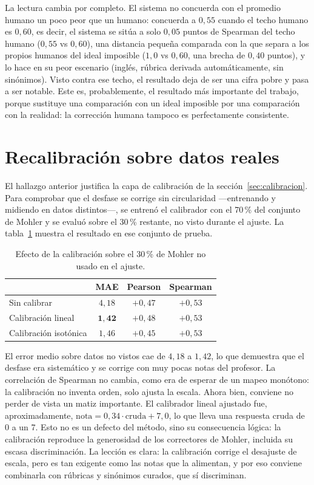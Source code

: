 La lectura cambia por completo. El sistema no concuerda con el promedio humano un poco peor que un humano: concuerda a $0{,}55$ cuando el techo humano es $0{,}60$, es decir, el sistema se sitúa a solo $0{,}05$ puntos de Spearman del techo humano ($0{,}55$ vs $0{,}60$), una distancia pequeña comparada con la que separa a los propios humanos del ideal imposible ($1{,}0$ vs $0{,}60$, una brecha de $0{,}40$ puntos), y lo hace en su peor escenario (inglés, rúbrica derivada automáticamente, sin sinónimos). Visto contra ese techo, el resultado deja de ser una cifra pobre y pasa a ser notable. Este es, probablemente, el resultado más importante del trabajo, porque sustituye una comparación con un ideal imposible por una comparación con la realidad: la corrección humana tampoco es perfectamente consistente.

\section{Recalibración sobre datos reales}

El hallazgo anterior justifica la capa de calibración de la sección~\ref{sec:calibracion}. Para comprobar que el desfase se corrige sin circularidad —entrenando y midiendo en datos distintos—, se entrenó el calibrador con el 70\,\% del conjunto de Mohler y se evaluó sobre el 30\,\% restante, no visto durante el ajuste. La tabla~\ref{tab:calibracion} muestra el resultado en ese conjunto de prueba.

\begin{table}[ht]
\centering
\caption{Efecto de la calibración sobre el 30\,\% de Mohler no usado en el ajuste.}
\label{tab:calibracion}
\small
\begin{tabular}{lccc}
\toprule
 & MAE & Pearson & Spearman \\
\midrule
Sin calibrar & $4{,}18$ & $+0{,}47$ & $+0{,}53$ \\
Calibración lineal & $\mathbf{1{,}42}$ & $+0{,}48$ & $+0{,}53$ \\
Calibración isotónica & $1{,}46$ & $+0{,}45$ & $+0{,}53$ \\
\bottomrule
\end{tabular}
\end{table}

El error medio sobre datos no vistos cae de $4{,}18$ a $1{,}42$, lo que demuestra que el desfase era sistemático y se corrige con muy pocas notas del profesor. La correlación de Spearman no cambia, como era de esperar de un mapeo monótono: la calibración no inventa orden, solo ajusta la escala. Ahora bien, conviene no perder de vista un matiz importante. El calibrador lineal ajustado fue, aproximadamente, $\mathrm{nota} = 0{,}34 \cdot \mathrm{cruda} + 7{,}0$, lo que lleva una respuesta cruda de 0 a un 7. Esto no es un defecto del método, sino su consecuencia lógica: la calibración reproduce la generosidad de los correctores de Mohler, incluida su escasa discriminación. La lección es clara: la calibración corrige el desajuste de escala, pero es tan exigente como las notas que la alimentan, y por eso conviene combinarla con rúbricas y sinónimos curados, que sí discriminan.

